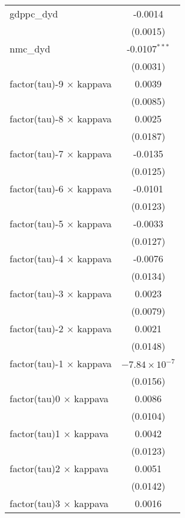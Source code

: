 \begin{tabular}{lc}
   gdppc\_dyd                      & -0.0014\\   
                                   & (0.0015)\\   
   nmc\_dyd                        & -0.0107$^{***}$\\   
                                   & (0.0031)\\   
   factor(tau)-9 $\times$ kappava  & 0.0039\\   
                                   & (0.0085)\\   
   factor(tau)-8 $\times$ kappava  & 0.0025\\   
                                   & (0.0187)\\   
   factor(tau)-7 $\times$ kappava  & -0.0135\\   
                                   & (0.0125)\\   
   factor(tau)-6 $\times$ kappava  & -0.0101\\   
                                   & (0.0123)\\   
   factor(tau)-5 $\times$ kappava  & -0.0033\\   
                                   & (0.0127)\\   
   factor(tau)-4 $\times$ kappava  & -0.0076\\   
                                   & (0.0134)\\   
   factor(tau)-3 $\times$ kappava  & 0.0023\\   
                                   & (0.0079)\\   
   factor(tau)-2 $\times$ kappava  & 0.0021\\   
                                   & (0.0148)\\   
   factor(tau)-1 $\times$ kappava  & $-7.84\times 10^{-7}$\\    
                                   & (0.0156)\\   
   factor(tau)0 $\times$ kappava   & 0.0086\\   
                                   & (0.0104)\\   
   factor(tau)1 $\times$ kappava   & 0.0042\\   
                                   & (0.0123)\\   
   factor(tau)2 $\times$ kappava   & 0.0051\\   
                                   & (0.0142)\\   
   factor(tau)3 $\times$ kappava   & 0.0016\\   

\end{tabular}
